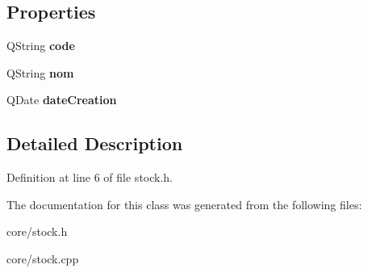 \subsection*{Properties}
\begin{DoxyCompactItemize}
\item 
\hypertarget{class_stock_a3b67b7abe80d6ec152659a3c525201ab}{
QString {\bfseries code}}
\label{class_stock_a3b67b7abe80d6ec152659a3c525201ab}

\item 
\hypertarget{class_stock_a08d5184d7ccfb0750140b1310010de3b}{
QString {\bfseries nom}}
\label{class_stock_a08d5184d7ccfb0750140b1310010de3b}

\item 
\hypertarget{class_stock_a9ad6ec4e4075212ba8abf4100523b946}{
QDate {\bfseries dateCreation}}
\label{class_stock_a9ad6ec4e4075212ba8abf4100523b946}

\end{DoxyCompactItemize}


\subsection{Detailed Description}


Definition at line 6 of file stock.h.



The documentation for this class was generated from the following files:\begin{DoxyCompactItemize}
\item 
core/stock.h\item 
core/stock.cpp\end{DoxyCompactItemize}
